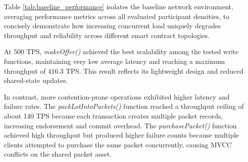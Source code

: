 \documentclass[12pt]{article}
\begin{document}
Table \ref{tab:baseline_performance} isolates the baseline network environment, averaging performance metrics across all evaluated participant densities, to concisely demonstrate how increasing concurrent load uniquely degrades throughput and reliability across different smart contract topologies. 

\begin{table}[ht]
\centering
\caption{Concise Baseline Network Performance Profiles (Average across all participant densities)}
\label{tab:baseline_performance}
\end{table}



At 500 TPS, \textit{makeOffer()} achieved the best scalability among the tested write functions, maintaining very low average latency and reaching a maximum throughput of 416.3 TPS. This result reflects its lightweight design and reduced shared-state updates.

In contrast, more contention-prone operations exhibited higher latency and failure rates. The \textit{packLotIntoPackets()} function reached a throughput ceiling of about 140 TPS because each transaction creates multiple packet records, increasing endorsement and commit overhead. The \textit{purchasePacket()} function achieved high throughput but produced higher failure counts because multiple clients attempted to purchase the same packet concurrently, causing MVCC conflicts on the shared packet asset.
\end{document}
